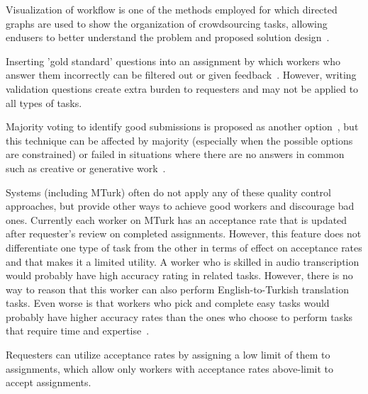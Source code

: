 Visualization of workflow is one of the methods employed for which directed graphs 
are used to show the organization of crowdsourcing tasks, allowing endusers 
to better understand the problem and proposed solution design~\cite{Kulkarni2012, Kittur2012}.

Inserting 'gold standard' questions into an assignment by which workers 
who answer them incorrectly can be filtered out or given feedback~\cite{Burch2009}. 
However, writing validation questions create extra burden to requesters and 
may not be applied to all types of tasks.

Majority voting to identify good submissions is proposed as another 
option~\cite{Burch2009, Bernstein2010}, but this technique can be affected 
by majority (especially when the possible options are constrained) or failed in 
situations where there are no answers in common such as creative or generative 
work~\cite{Rzeszotarski2012}.

Systems (including MTurk) often do not apply any of these quality control approaches, 
but provide other ways to achieve good workers and discourage bad ones. 
Currently each worker on MTurk has an acceptance rate that is updated after 
requester's review on completed assignments. However, this feature does not 
differentiate one type of task from the other in terms of effect on acceptance rates 
and that makes it a limited utility. A worker who is skilled in audio transcription would 
probably have high accuracy rating in related tasks. However, there is no way to 
reason that this worker can also perform English-to-Turkish translation tasks. 
Even worse is that workers who pick and complete easy tasks would probably 
have higher accuracy rates than the ones who choose to perform tasks that 
require time and expertise~\cite{Barowy2012}.

Requesters can utilize acceptance rates by assigning a low limit of them to 
assignments, which allow only workers with acceptance rates above-limit 
to accept assignments.
